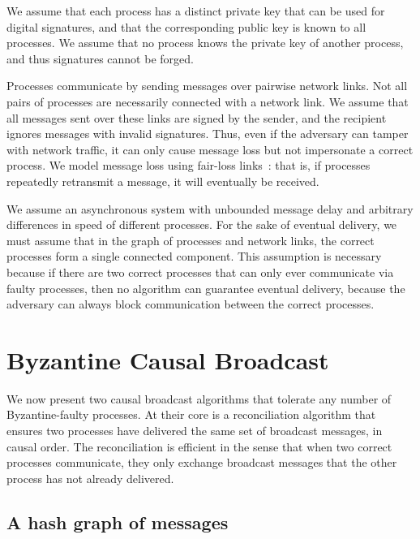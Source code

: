 \documentclass[a4paper,anonymous,USenglish]{lipics-v2019}
\begin{document}
We assume that each process has a distinct private key that can be used for digital signatures, and that the corresponding public key is known to all processes.
We assume that no process knows the private key of another process, and thus signatures cannot be forged.

Processes communicate by sending messages over pairwise network links.
Not all pairs of processes are necessarily connected with a network link.
We assume that all messages sent over these links are signed by the sender, and the recipient ignores messages with invalid signatures.
Thus, even if the adversary can tamper with network traffic, it can only cause message loss but not impersonate a correct process.
We model message loss using fair-loss links~\cite{Cachin:2011wt}: that is, if processes repeatedly retransmit a message, it will eventually be received.

We assume an asynchronous system with unbounded message delay and arbitrary differences in speed of different processes.
For the sake of eventual delivery, we must assume that in the graph of processes and network links, the correct processes form a single connected component.
This assumption is necessary because if there are two correct processes that can only ever communicate via faulty processes, then no algorithm can guarantee eventual delivery, because the adversary can always block communication between the correct processes.




\section{Byzantine Causal Broadcast}\label{sec:algorithm}

We now present two causal broadcast algorithms that tolerate any number of Byzantine-faulty processes.
At their core is a reconciliation algorithm that ensures two processes have delivered the same set of broadcast messages, in causal order.
The reconciliation is efficient in the sense that when two correct processes communicate, they only exchange broadcast messages that the other process has not already delivered.

\subsection{A hash graph of messages}
\end{document}

